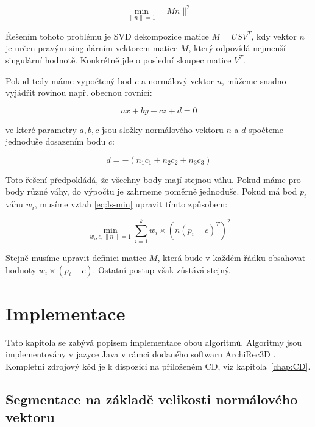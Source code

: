 \documentclass[11pt,twoside,a4paper]{book}
\begin{document}
\begin{equation}
\min_{\|n\|=1} \|M n\|^2
\end{equation}

Řešením tohoto problému je SVD dekompozice matice $M = USV^T$, kdy vektor $n$ je určen pravým singulárním vektorem matice $M$, který odpovídá nejmenší singulární hodnotě. Konkrétně jde o poslední sloupec matice $V^T$.

Pokud tedy máme vypočtený bod $c$ a normálový vektor $n$, můžeme snadno vyjádřit rovinou např. obecnou rovnicí:

\begin{equation}
ax + by + cz + d = 0
\end{equation}

\noindent
ve které parametry $a, b, c$ jsou složky normálového vektoru $n$ a $d$ spočteme jednoduše dosazením bodu $c$:

\begin{equation}
\label{eq:d}
d = -(n_1c_1 + n_2c_2 + n_3c_3)
\end{equation}

Toto řešení předpokládá, že všechny body mají stejnou váhu. Pokud máme pro body různé váhy, do výpočtu je zahrneme poměrně jednoduše. Pokud má bod $p_i$ váhu $w_i$, musíme vztah \ref{eq:ls-min} upravit tímto způsobem:

\begin{equation}
\min_{w_i,c,\|n\|=1} \sum\limits_{i=1}^k w_i \times (n (p_i - c)^T)^2
\end{equation}

Stejně musíme upravit definici matice $M$, která bude v každém řádku obsahovat hodnoty $w_i \times (p_i - c)$. Ostatní postup však zůstává stejný.

\chapter{Implementace}
\label{chap:implementace}

Tato kapitola se zabývá popisem implementace obou algoritmů. Algoritmy jsou implementovány v jazyce Java v rámci dodaného softwaru ArchiRec3D \cite{AR3D}. Kompletní zdrojový kód je k dispozici na přiloženém CD, viz kapitola~\ref{chap:CD}.

\section{Segmentace na základě velikosti normálového vektoru}
\label{sec:seg1}
\end{document}
